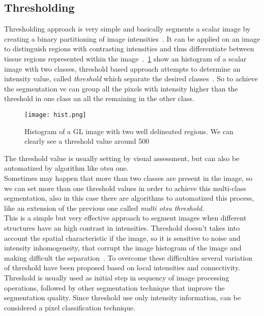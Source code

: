 \documentclass{standalone}
\begin{document}
\subsection{Thresholding}

Thresholding approach is very simple and basically segments a scalar image by creating a binary partitioning of image intensities~\cite{ART:Pham}. It can be applied on an image to distinguish regions with contrasting intensities and thus differentiate between tissue regions represented within the image~\cite{INP:Withey}. \figurename\,\ref{fig:Histogram} show an histogram of a scalar image with two classes, threshold based approach attempts to determine an intensity value, called \emph{threshold} which separate the desired classes~\cite{ART:Pham}. So to achieve the segmentation ve can group all the pixels with intensity higher than the threshold in one class an all the remaining in the other class. 

\begin{figure}[hp]

	\centering
		\texttt{[image: hist.png]}
	\label{fig:Histogram}\caption{Histogram of a GL image with two well delineated regions. We can clearly see a threshold value around 500}
\end{figure}

The threshold value is usually setting by visual assessment, but can also be automatized by algorithm like otsu one.\\
Sometimes may happen that more than two classes are present in the image, so we can set more than one threshold values in order to achieve this multi-class segmentation, also in this case there are algorithms to automatized this process, like an extension of the previous one called \emph{multi otsu threshold}.\\
This is a simple but very effective approach to segment images when different structures have an high contrast in intensities. Threshold doesn't takes into account the spatial characteristic if the image, so it is sensitive to noise and intensity inhomogeneity, that corrupt the image histogram of the image and making difficult the separation~\cite{ART:Pham}. To overcome these difficulties several variation of threshold have been proposed based on local intensities and connectivity. \\
Threshold is usually used as initial step in sequency of image processing operations, followed by other segmentation technique that improve the segmentation quality. 
Since threshold use only intensity information, can be considered a pixel classification technique. 
\end{document}
